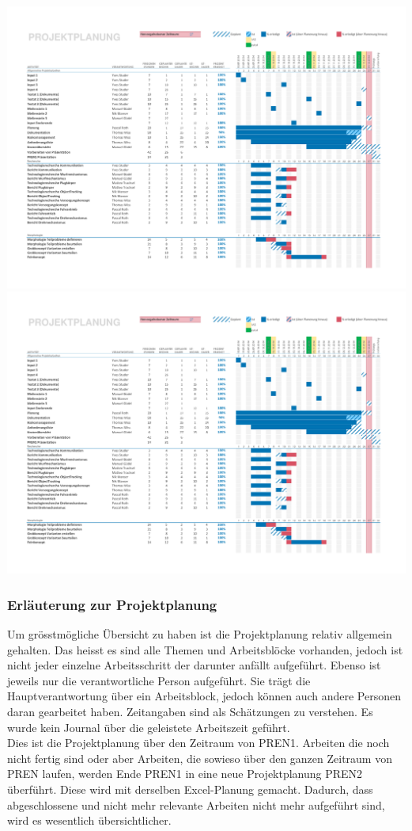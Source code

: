 \begin{landscape}
    \includegraphics[page=1,scale=0.8,clip,trim=15mm 22mm 13mm 18mm] {Enddokumentation/Projektplanung_Management/Bilder/Projekt-Planung_Team32.pdf}
    \newpage
    \includegraphics[page=2,scale=0.8,clip,trim=15mm 100mm 13mm 10mm] {Enddokumentation/Projektplanung_Management/Bilder/Projekt-Planung_Team32.pdf}
    \newpage
\end{landscape}
\subsubsection{Erläuterung zur Projektplanung}
Um grösstmögliche Übersicht zu haben ist die Projektplanung relativ allgemein gehalten. Das heisst es sind alle Themen und Arbeitsblöcke vorhanden, jedoch ist nicht jeder einzelne Arbeitsschritt der darunter anfällt aufgeführt. Ebenso ist jeweils nur die verantwortliche Person aufgeführt. Sie trägt die Hauptverantwortung über ein Arbeitsblock, jedoch können auch andere Personen daran gearbeitet haben. Zeitangaben sind als Schätzungen zu verstehen. Es wurde kein Journal über die geleistete Arbeitszeit geführt.\\
Dies ist die Projektplanung über den Zeitraum von PREN1. Arbeiten die noch nicht fertig sind oder aber Arbeiten, die sowieso über den ganzen Zeitraum von PREN laufen, werden Ende PREN1 in eine neue Projektplanung PREN2 überführt. Diese wird mit derselben Excel-Planung gemacht. Dadurch, dass abgeschlossene und nicht mehr relevante Arbeiten nicht mehr aufgeführt sind, wird es wesentlich übersichtlicher.  
